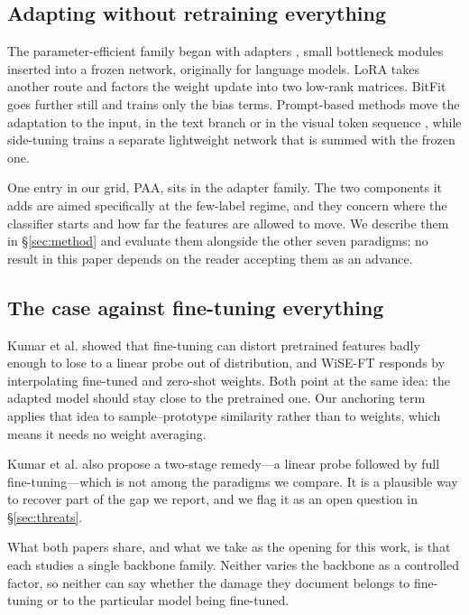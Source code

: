 \documentclass[preprint,12pt]{elsarticle}
\newcommand{\ours}{\textsc{PAA}}
\begin{document}
\subsection{Adapting without retraining everything}

The parameter-efficient family began with adapters \cite{houlsby2019adapter},
small bottleneck modules inserted into a frozen network, originally for language
models. LoRA \cite{hu2022lora} takes another route and factors the weight update
into two low-rank matrices. BitFit \cite{benzaken2022bitfit} goes further still
and trains only the bias terms. Prompt-based methods move the adaptation to the
input, in the text branch \cite{zhou2022coop} or in the visual token sequence
\cite{jia2022vpt}, while side-tuning \cite{zhang2020sidetuning} trains a separate
lightweight network that is summed with the frozen one.

One entry in our grid, \ours, sits in the adapter family. The two components it
adds are aimed specifically at the few-label regime, and they concern where the
classifier starts and how far the features are allowed to move. We describe them
in \S\ref{sec:method} and evaluate them alongside the other seven paradigms; no
result in this paper depends on the reader accepting them as an advance.

\subsection{The case against fine-tuning everything}

Kumar et al. \cite{kumar2022finetuning} showed that fine-tuning can distort
pretrained features badly enough to lose to a linear probe out of distribution,
and WiSE-FT \cite{wortsman2022wiseft} responds by interpolating fine-tuned and
zero-shot weights. Both point at the same idea: the adapted model should stay
close to the pretrained one. Our anchoring term applies that idea to
sample--prototype similarity rather than to weights, which means it needs no
weight averaging.

Kumar et al. \cite{kumar2022finetuning} also propose a two-stage remedy---a linear
probe followed by full fine-tuning---which is not among the paradigms we compare.
It is a plausible way to recover part of the gap we report, and we flag it as an
open question in \S\ref{sec:threats}.

What both papers share, and what we take as the opening for this work, is that
each studies a single backbone family. Neither varies the backbone as a
controlled factor, so neither can say whether the damage they document belongs to
fine-tuning or to the particular model being fine-tuned.
\end{document}

